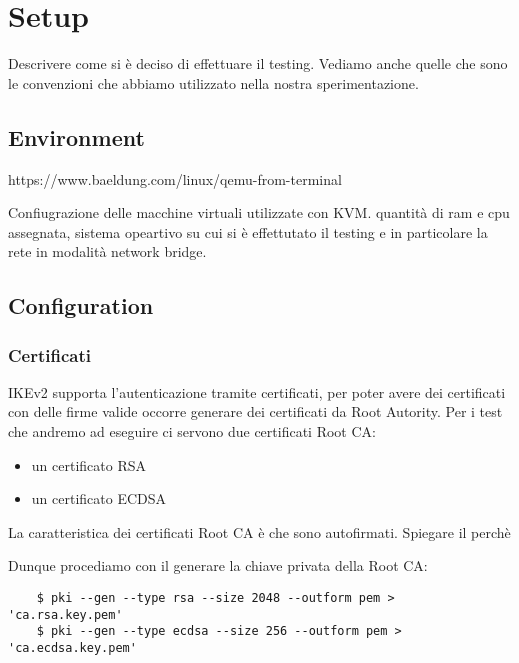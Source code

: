\documentclass[
10pt, %
a4paper, %
oneside, %
headinclude,footinclude, %
BCOR5mm, %
]{scrartcl}
\begin{document}

\section{Setup}

Descrivere come si è deciso di effettuare il testing. Vediamo anche quelle che sono le convenzioni che abbiamo utilizzato nella nostra sperimentazione.

\subsection{Environment}

https://www.baeldung.com/linux/qemu-from-terminal

Confiugrazione delle macchine virtuali utilizzate con KVM. quantità di ram e cpu assegnata, sistema opeartivo su cui si è
effettutato il testing e in particolare la rete in modalità network bridge.


\subsection{Configuration} 

    
\subsubsection*{Certificati}

IKEv2 supporta l'autenticazione tramite certificati, per poter avere dei certificati con delle firme valide occorre generare dei certificati da Root Autority.
Per i test che andremo ad eseguire ci servono due certificati Root CA:
\begin{itemize}
    \item un certificato RSA
    \item un certificato ECDSA
\end{itemize}

\noindent
La caratteristica dei certificati Root CA è che sono autofirmati. Spiegare il perchè

Dunque procediamo con il generare la chiave privata della Root CA:
\begin{lstlisting}
    $ pki --gen --type rsa --size 2048 --outform pem > 'ca.rsa.key.pem'
    $ pki --gen --type ecdsa --size 256 --outform pem > 'ca.ecdsa.key.pem'
\end{lstlisting} 
\end{document}
